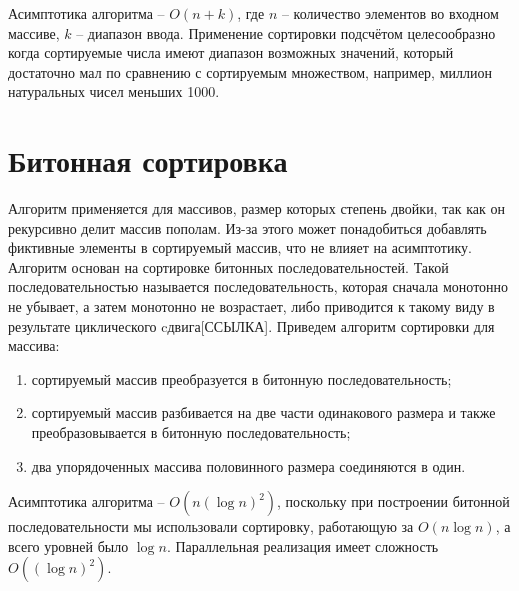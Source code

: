 Асимптотика алгоритма -- $O(n + k)$, где $n$ -- количество элементов во входном массиве, $k$ -- диапазон ввода. Применение сортировки подсчётом целесообразно когда сортируемые числа имеют диапазон возможных значений, который достаточно мал по сравнению с сортируемым множеством, например, миллион натуральных чисел меньших 1000.


\section{Битонная сортировка}

Алгоритм применяется для массивов, размер которых степень двойки, так как он рекурсивно делит массив пополам. Из-за этого может понадобиться добавлять фиктивные элементы в сортируемый массив, что не влияет на асимптотику. Алгоритм основан на сортировке битонных последовательностей. Такой последовательностью называется последовательность, которая сначала монотонно не убывает, а затем монотонно не возрастает, либо приводится к такому виду в результате циклического cдвига[ССЫЛКА]. Приведем алгоритм сортировки для массива:
\begin{enumerate}
	\item сортируемый массив преобразуется в битонную последовательность;
	\item сортируемый массив разбивается на две части одинакового размера и также преобразовывается в битонную последовательность;
	\item два упорядоченных массива половинного размера соединяются в один.
\end{enumerate}

Асимптотика алгоритма -- $O(n (\log n)^{2})$, поскольку при построении битонной последовательности мы использовали сортировку, работающую за $O(n\log n)$, а всего уровней было $\log n$. Параллельная реализация имеет сложность $O((\log n)^{2})$.